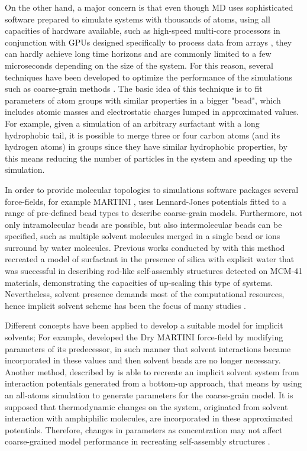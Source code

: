 \documentclass[10pt,a4paper,twoside]{article}
\begin{document}
On the other hand, a major concern is that even though MD uses sophisticated software prepared to simulate systems with thousands of atoms, using all capacities of hardware available, such as high-speed multi-core processors in conjunction with GPUs designed specifically to process data from arrays \cite{gromacs}, they can hardly achieve long time horizons and are commonly limited to a few microseconds depending on the size of the system. For this reason, several techniques have been developed to optimize the performance of the simulations such as coarse-grain methods \cite{mjsilica}. The basic idea of this technique is to fit parameters of atom groups with similar properties in a bigger "bead", which includes atomic masses and electrostatic charges lumped in approximated values. For example, given a simulation of an arbitrary surfactant with a long hydrophobic tail, it is possible to merge three or four carbon atoms (and its hydrogen atoms) in groups since they have similar hydrophobic properties, by this means reducing the number of particles in the system and speeding up the simulation. 

In order to provide molecular topologies to simulations software packages several force-fields, for example MARTINI \cite{martini}, uses Lennard-Jones potentials fitted to a range of pre-defined bead types to describe coarse-grain models. Furthermore, not only intramolecular beads are possible, but also intermolecular beads can be specified, such as multiple solvent molecules merged in a single bead or ions surround by water molecules. Previous works conducted by \cite{mjsilica} with this method recreated a model of surfactant in the presence of silica with explicit water that was successful in describing rod-like self-assembly structures detected on MCM-41 materials, demonstrating the capacities of up-scaling this type of systems. Nevertheless, solvent presence demands most of the computational resources, hence  implicit solvent scheme has been the focus of many studies \cite{gromacs}.

Different concepts have been applied to develop a suitable model for implicit solvents; For example,  developed the Dry MARTINI force-field by modifying parameters of its predecessor, in such manner that solvent interactions became incorporated in these values and then solvent beads are no longer necessary. Another method, described by  is able to recreate an implicit solvent system from interaction potentials generated from a bottom-up approach, that means by using an all-atoms simulation to generate parameters for the coarse-grain model. It is supposed  that thermodynamic changes on the system, originated from solvent interaction with amphiphilic molecules, are incorporated in these approximated potentials. Therefore, changes in parameters as concentration may not affect coarse-grained model performance in recreating self-assembly structures \cite{dmpc}.
\end{document}
